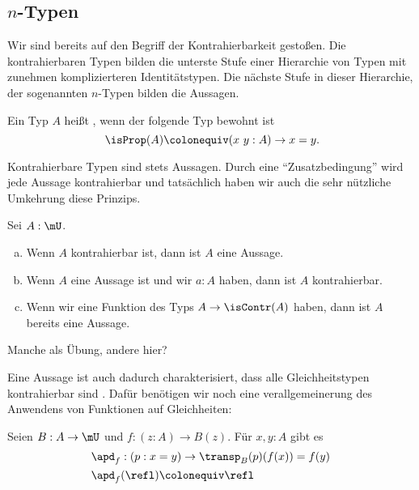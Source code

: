 \subsection{$n$-Typen}

Wir sind bereits auf den Begriff der Kontrahierbarkeit gestoßen.
Die kontrahierbaren Typen bilden die unterste Stufe einer Hierarchie
von Typen mit zunehmen komplizierteren Identitätstypen.
Die nächste Stufe in dieser Hierarchie, der sogenannten $n$-Typen bilden die Aussagen.

\begin{definition}
  Ein Typ $A$ heißt , wenn der folgende Typ bewohnt ist
  \[
    \isProp(A)\colonequiv (x\ y : A)\to x=y\rlap{.}
  \]
\end{definition}

Kontrahierbare Typen sind stets Aussagen.
Durch eine ``Zusatzbedingung'' wird jede Aussage kontrahierbar und tatsächlich haben wir auch die sehr nützliche Umkehrung diese Prinzips.

\begin{bemerkung}
  Sei $A:\mU$.
  \begin{enumerate}[(a)]
  \item Wenn $A$ kontrahierbar ist, dann ist $A$ eine Aussage.
  \item Wenn $A$ eine Aussage ist und wir $a:A$ haben, dann ist $A$ kontrahierbar.
  \item Wenn wir eine Funktion des Typs $A\to \isContr(A)$ haben, dann ist $A$ bereits eine Aussage. 
  \end{enumerate}
\end{bemerkung}

\begin{beweis}
  Manche als Übung, andere hier?
\end{beweis}

Eine Aussage ist auch dadurch charakterisiert, dass alle Gleichheitstypen kontrahierbar sind .
Dafür benötigen wir noch eine verallgemeinerung des Anwendens von Funktionen auf Gleichheiten:

\begin{definition}
  Seien $B:A\to \mU$ und $f:(z:A)\to B(z)$.
  Für $x,y:A$ gibt es
  \begin{align*}
    &\apd_f : (p:x=y) \to \transp_B(p)(f(x))=f(y) \\
    &\apd_f(\refl)\colonequiv \refl
  \end{align*}
\end{definition}

